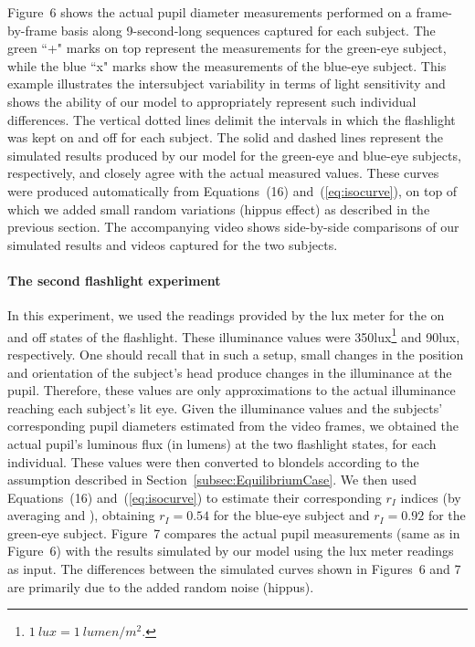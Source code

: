 \documentclass{acmtog} %
\begin{document}
Figure~6 shows the actual pupil diameter measurements performed on a
frame-by-frame basis along 9-second-long sequences captured for each
subject. The green ``+" marks on top represent the measurements for the
green-eye subject, while the blue ``x" marks show the measurements of
the blue-eye subject. This example illustrates the intersubject
variability in terms of light sensitivity and shows the ability of our
model to appropriately represent such individual differences. The
vertical dotted lines delimit the intervals in which the flashlight was
kept on and off for each subject.
The solid and dashed lines represent the simulated results produced by
our model for the green-eye and blue-eye subjects, respectively, and
closely agree with the actual measured values. These curves were
produced automatically from Equations~(16) and~(\ref{eq:isocurve}), on
top of which we added small random variations (hippus effect) as
described in the previous section. The accompanying video shows
side-by-side comparisons of our simulated results and videos captured
for the two subjects.
 
\paragraph{The second flashlight experiment}
In this experiment, we used the readings provided by the lux meter for
the {on} and {off} states of the flashlight. These illuminance values
were 350lux\footnote{$1~{{lux}} = 1~{{lumen}} /m^2$.} and 90lux,
respectively. One should recall that in such a setup, small changes in
the position and orientation of the subject's head produce changes in
the illuminance at the pupil. Therefore, these values are only
approximations to the actual illuminance reaching each subject's lit
eye. Given the illuminance values and the subjects' corresponding pupil
diameters estimated from the video frames, we obtained the actual
pupil's luminous flux (in lumens) at the two flashlight states, for each
individual. These values were then converted to blondels according to
the assumption described in Section~\ref{subsec:EquilibriumCase}. We
then used Equations~(16) and~(\ref{eq:isocurve}) to estimate their
corresponding $r_I$ indices (by averaging  and
), obtaining $r_I = 0.54$ for the blue-eye subject
and $r_I = 0.92$ for the green-eye subject. Figure~7 compares the actual
pupil measurements (same as in Figure~6) with the results simulated by
our model using the lux meter readings as input. The differences between
the simulated curves shown in Figures~6 and 7 are primarily due to the
added random noise (hippus).
\end{document}
